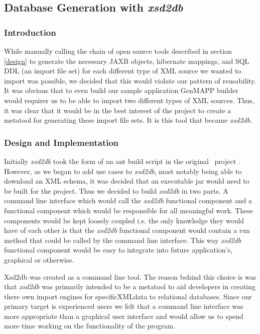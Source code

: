 \subsection{Database Generation with \emph{xsd2db}}
\label{xsd2db}
\subsubsection{Introduction}
While manually calling the chain of open source tools described in section \ref{design} to generate the necessary JAXB objects, hibernate mappings, and SQL DDL (an import file set) for each different type of XML source we wanted to import was possible, we decided that this would violate our pattern of reusability.  It was obvious that to even build our sample application GenMAPP builder would requirer us to be able to import two different types of XML sources.   Thus, it was clear that it would be in the best interest of the project to create a metatool for generating these import file sets.  It is this tool that became \emph{xsd2db}.
    
\subsubsection{Design and Implementation}
Initially \emph{xsd2db} took the form of an ant build script in the original \xmlpipedb~project \cite{xmlpipedb}.  However, as we began to add use cases to \emph{xsd2db}, most notably being able to download an XML schema,  it was decided that an executable jar would need to be built for the project.  Thus we decided to build \emph{xsd2db} in two parts.  A command line interface which would call the \emph{xsd2db} functional component and a functional component which would be responsible for all meaningful work.  These components would be kept loosely coupled i.e. the only knowledge they would have of each other is that  the \emph{xsd2db} functional component would contain a run method that could be called by the command line interface.  This way \emph{xsd2db} functional component would be easy to integrate into future application's, graphical or otherwise.   

Xsd2db was created as a command line tool.  The reason behind this choice is was that \emph{xsd2db} was primarily intended to be a metatool to aid developers in creating there own import engines for specificXMLdata to relational databases.  Since our primary target is experienced users we felt that a command line interface was more appropriate than a graphical user interface and would allow us to spend more time working on the functionality of the program.    


